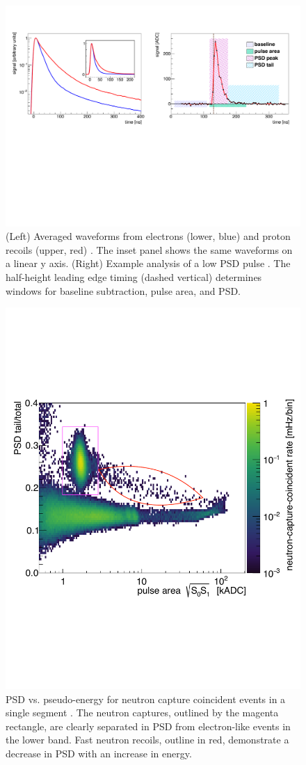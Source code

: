 \begin{figure}[t]
	\centering
	\includegraphics[width=0.99\linewidth]{tex/5-analysis-images/PSD_Define}
	\caption[Typical waveform]{(Left) Averaged waveforms from electrons (lower, blue) and proton recoils (upper, red) \cite{MM:2773}. The inset panel shows the same waveforms on a linear y axis. (Right) Example analysis of a low PSD pulse \cite{MM:2764}. The half-height leading edge timing (dashed vertical) determines windows for baseline subtraction, pulse area, and PSD. }
	\label{fig:psddefine}
\end{figure}

\begin{figure}[h]
	\centering
	\includegraphics[width=0.6\linewidth]{tex/5-analysis-images/PSD_vs_S_NRC}
	\caption[PSD vs. psuedo-energy for neutron coincident events]{PSD vs. pseudo-energy for neutron capture coincident events in a single segment \cite{MM:2731}. The neutron captures, outlined by the magenta rectangle, are clearly separated in PSD from electron-like events in the lower band. Fast neutron recoils, outline in red, demonstrate a decrease in PSD with an increase in energy.}
	\label{fig:psdvss}
\end{figure}


